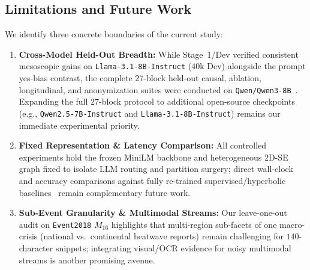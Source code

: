 \subsection{Limitations and Future Work}
\label{sec:limitations}
We identify three concrete boundaries of the current study:
\begin{enumerate}
    \item \textbf{Cross-Model Held-Out Breadth:} While Stage~1/Dev verified consistent mesoscopic gains on \texttt{Llama-3.1-8B-Instruct} ($40\text{k}$ Dev) alongside the prompt yes-bias contrast, the complete $27$-block held-out causal, ablation, longitudinal, and anonymization suites were conducted on \texttt{Qwen/Qwen3-8B}~\citep{yang2025qwen3}. Expanding the full $27$-block protocol to additional open-source checkpoints (e.g., \texttt{Qwen2.5-7B-Instruct} and \texttt{Llama-3.1-8B-Instruct}) remains our immediate experimental priority.
    \item \textbf{Fixed Representation \& Latency Comparison:} All controlled experiments hold the frozen MiniLM backbone and heterogeneous 2D-SE graph fixed to isolate LLM routing and partition surgery; direct wall-clock and accuracy comparisons against fully re-trained supervised/hyperbolic baselines~\citep{cao2021kpgnn,yu2025hypersed,qiu2026lhg} remain complementary future work.
    \item \textbf{Sub-Event Granularity \& Multimodal Streams:} Our leave-one-out audit on \texttt{Event2018} $M_{16}$ highlights that multi-region sub-facets of one macro-crisis (national vs.\ continental heatwave reports) remain challenging for $140$-character snippets; integrating visual/OCR evidence for noisy multimodal streams is another promising avenue.
\end{enumerate}

